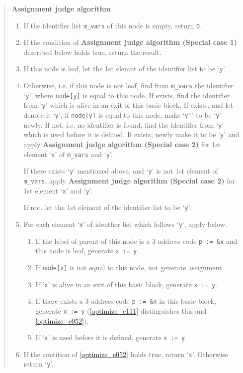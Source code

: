 \begin{quote}
{\bf Assignment judge algorithm}

\begin{enumerate}
\item If the identifier list {\tt{m\_vars}} of this node is empty,
      return {\tt{0}}.
\item  \label{optimize_e067}
      If the condition of
      {\bf Assignment judge algorithm (Special case 1) }
      described below holds true, return the result.
\item \label{optimize_e055}
      If this node is leaf, 
      let the 1st elemnt of the identifier list to be `{\tt{y}}'.
\item \label{optimize_e054}
      Otherwise, i.e. if this node is not leaf,
      find from {\tt{m\_vars}} the identifier `{\tt{y}}', where
      {\tt{node[y]}} is equal to this node. If exists, find the
      identifier from `{\tt{y}}' which is alive in an exit of this
      basic block. If exists, and let denote it `{\tt{y}}', 
      if {\tt{node[y]}} is equal to this node, make `{\tt{y'}}' to be
      `{\tt{y}}' newly. If not, i.e. no identifier is found, find
      the identifier from `{\tt{y}}' which is used before it is defined. 
      If exists, newly make it to be `{\tt{y}}' and apply
      {\bf Assignment judge algorithm (Special case 2)} for 1st element
      `{\tt{x}}' of {\tt{m\_vars}} and `{\tt{y}}'.

      If there exists `{\tt{y}}' mentioned above, and `{\tt{y}}' is
      not 1st element of {\tt{m\_vars}},
      apply {\bf Assignment judge algorithm (Special case 2)}
      for 1st element `{\tt{x}}' and  `{\tt{y}}'.

      If not, let the 1st element of the identifier list to be `{\tt{y}}'.
 \item 
      For each element `{\tt{x}}' of identfier list which follows `{\tt{y}}',
      apply below.
\begin{enumerate}
\item \label{optimize_e052}
      If the label of parent of this node is a 3 address code
      {\tt{p := \&x}} and this node is leaf, generate {\tt{x := y}}.
\item If {\tt{node[x]}} is not equal to this node, 
      not generate assignment.
\item \label{optimize_e053} 
      If `{\tt{x}}' is alive in an exit of this basic block,
      generate {\tt{x := y}}.
\item \label{optimize_e110} 
      If there exists a 3 address code {\tt{p := \&x}} in this
      basic block, generate {\tt{x := y}}
      (\ref{optimize_e111} distinguishes this and \ref{optimize_e052}).
\item If `{\tt{x}}' is used before it is defined, 
      generate {\tt{x := y}}.
\end{enumerate}

\item \label{optimize_e111}
If the contition of \ref{optimize_e052} holds true,
      return `{\tt{x}}'. Otherwise return `{\tt{y}}'. 
\end{enumerate}
\end{quote}

